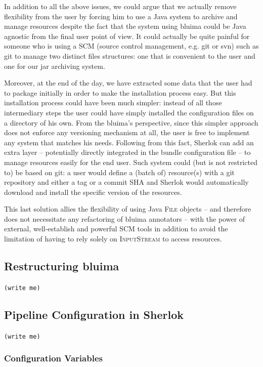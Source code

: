 \documentclass{article}
\newcommand{\id}[1]{\mbox{\textsc{#1}}}
\newcommand{\TODO}[1]{\texttt{\textcolor{YellowOrange}{(#1)}}} %
\begin{document}
In addition to all the above issues, we could argue that we actually remove flexibility from the user by forcing him to use a Java system to archive and manage resources despite the fact that the system using bluima could be Java agnostic from the final user point of view. It could actually be quite painful for someone who is using a SCM (source control management, e.g. git or svn) such as git to manage two distinct files structures: one that is convenient to the user and one for our jar archiving system.

Moreover, at the end of the day, we have extracted some data that the user had to package initially in order to make the installation process easy. But this installation process could have been much simpler: instead of all those intermediary steps the user could have simply installed the configuration files on a directory of his own. From the bluima's perspective, since this simpler approach does not enforce any versioning mechanism at all, the user is free to implement any system that matches his needs. Following from this fact, Sherlok can add an extra layer -- potentially directly integrated in the bundle configuration file -- to manage resources easily for the end user. Such system could (but is not restricted to) be based on git: a user would define a (batch of) resource(s) with a git repository and either a tag or a commit SHA and Sherlok would automatically download and install the specific version of the resources.

This last solution allies the flexibility of using Java \id{File} objects -- and therefore does not necessitate any refactoring of bluima annotators -- with the power of external, well-establish and powerful SCM tools in addition to avoid the limitation of having to rely solely on \id{InputStream} to access resources.

\subsection{Restructuring bluima}

\TODO{write me}

\subsection{Pipeline Configuration in Sherlok}

\TODO{write me}

\subsubsection{Configuration Variables}
\end{document}

